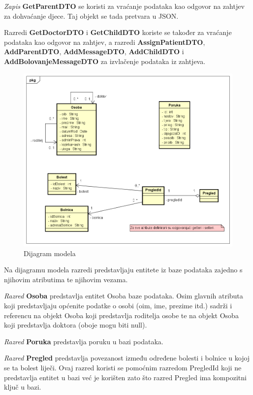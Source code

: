 			\textit{Zapis }\textbf{GetParentDTO} se koristi za vraćanje podataka kao odgovor na zahtjev za dohvaćanje djece. Taj objekt se tada pretvara u JSON.  
			
			Razredi \textbf{GetDoctorDTO} i \textbf{GetChildDTO} koriste se također za vraćanje podataka kao odgovor na zahtjev, a razredi \textbf{AssignPatientDTO}, \textbf{AddParentDTO}, \textbf{AddMessageDTO}, \textbf{AddChildDTO} i \textbf{AddBolovanjeMessageDTO} za izvlačenje podataka iz zahtjeva.
			
			\begin{figure}[H]
				\includegraphics[width=\textwidth]{dijagrami/DijagramDomain.PNG} %
				\caption{Dijagram modela}
				\label{fig:dijagramdomain} %
			\end{figure}
			
			Na dijagramu modela razredi predstavljaju entitete iz baze podataka zajedno s njihovim atributima te njihovim vezama.
			
			\textit{Razred }\textbf{Osoba}
			predstavlja entitet Osoba baze podataka. 
			Osim glavnih atributa koji predstavljaju općenite podatke o osobi (oim, ime, prezime itd.) sadrži i referencu na objekt Osoba koji predstavlja roditelja osobe te na objekt Osoba koji predstavlja doktora (oboje mogu biti null).
			
			\textit{Razred }\textbf{Poruka} predstavlja poruku u bazi podataka. 
			
			\textit{Razred }\textbf{Pregled} predstavlja povezanost između određene bolesti i bolnice u kojoj se ta bolest liječi. Ovaj razred koristi se pomoćnim razredom PregledId koji ne predstavlja entitet u bazi već je korišten zato što razred Pregled ima kompozitni ključ u bazi.
			

